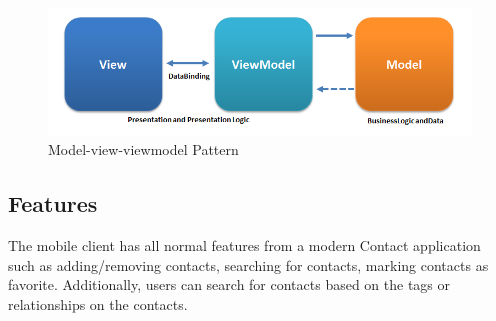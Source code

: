 \begin{figure}[!h]
\begin{centering}
\includegraphics[scale=0.55]{pics/mvvm_pattern.png}
\caption{Model-view-viewmodel Pattern}\label{fg:mvvm_pattern}
\end{centering}
\end{figure}

\subsection{Features}
The mobile client has all normal features from a modern Contact application such as adding/removing contacts, searching for contacts, marking contacts as favorite. Additionally, users can search for contacts based on the tags or relationships on the contacts.

